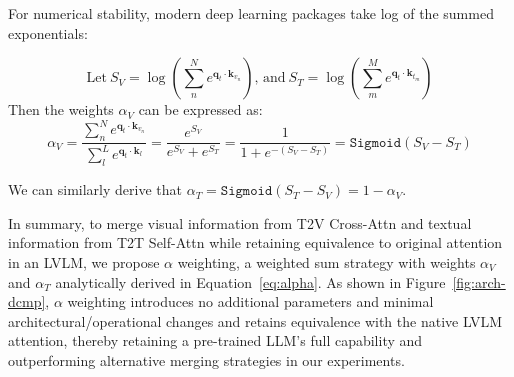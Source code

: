 For numerical stability, modern deep learning packages take log of the summed exponentials:

\begin{equation}
\text{Let}\ S_V = \log\left(\sum_{n}^{N} e^{\bm{q}_{t}\cdot \bm{k}_{v_n}}\right) \text{, and}\ S_T = \log\left(\sum_{m}^{M} e^{\bm{q}_{t}\cdot \bm{k}_{t_m}}\right)
\end{equation}
Then the weights $\alpha_V$ can be expressed as:
\begin{equation}
\alpha_V
= \frac{\sum_{n}^{N} e^{\bm{q}_{t}\cdot \bm{k}_{v_n}}}{\sum_{l}^{L} e^{\bm{q}_{t}\cdot \bm{k}_{l}}}
= \frac{e^{S_V}}{e^{S_V}+e^{S_T}}
= \frac{1}{1+e^{-(S_{V}-S_{T})}}
= \texttt{Sigmoid}(S_V - S_T) \label{eq:alpha}
\end{equation}

We can similarly derive that $\alpha_T=\texttt{Sigmoid}(S_T - S_V) = 1-\alpha_V$.

In summary, to merge visual information from T2V Cross-Attn and textual information from T2T Self-Attn while retaining equivalence to original attention in an LVLM, we propose $\alpha$ weighting, a weighted sum strategy with weights $\alpha_V$ and $\alpha_T$ analytically derived in Equation~\ref{eq:alpha}.
As shown in Figure~\ref{fig:arch-dcmp}, $\alpha$ weighting introduces no additional parameters and minimal architectural/operational changes and retains equivalence with the native LVLM attention, thereby retaining a pre-trained LLM's full capability and outperforming alternative merging strategies in our experiments.